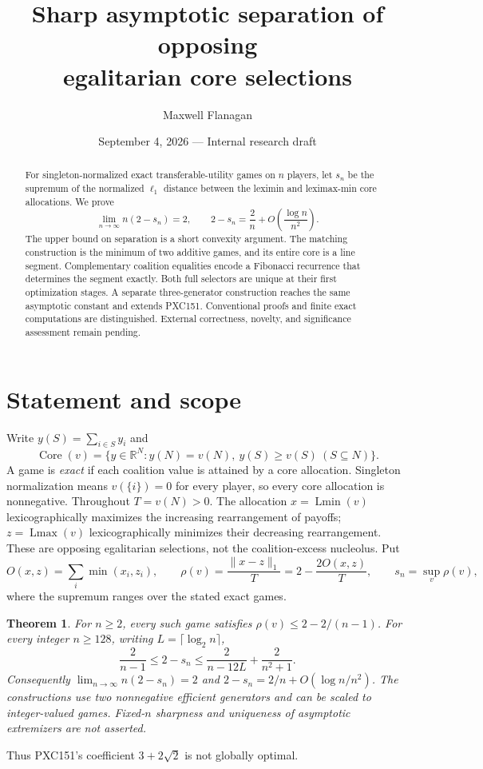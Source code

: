 \documentclass[11pt]{article}
\title{Sharp asymptotic separation of opposing\\ egalitarian core selections}
\author{Maxwell Flanagan}
\date{September 4, 2026 --- Internal research draft}
\newtheorem{theorem}{Theorem}
\newcommand{\Lmin}{\operatorname{Lmin}}
\newcommand{\Lmax}{\operatorname{Lmax}}
\newcommand{\Core}{\operatorname{Core}}
\begin{document}
\maketitle
\begin{abstract}
For singleton-normalized exact transferable-utility games on $n$ players,
let $s_n$ be the supremum of the normalized $\ell_1$ distance between the
leximin and leximax-min core allocations. We prove
\[
 \lim_{n\to\infty}n(2-s_n)=2,
 \qquad 2-s_n=\frac2n+O\!\left(\frac{\log n}{n^2}\right).
\]
The upper bound on separation is a short convexity argument. The matching
construction is the minimum of two additive games, and its entire core is
a line segment. Complementary coalition equalities encode a Fibonacci
recurrence that determines the segment exactly. Both full selectors are
unique at their first optimization stages. A separate three-generator
construction reaches the same asymptotic constant and extends PXC151.
Conventional proofs and finite exact computations are distinguished.
External correctness, novelty, and significance assessment remain pending.
\end{abstract}

\section{Statement and scope}
Write $y(S)=\sum_{i\in S}y_i$ and
\[
 \Core(v)=\{y\in\mathbb R^N:y(N)=v(N),\ y(S)\ge v(S)\ (S\subseteq N)\}.
\]
A game is \emph{exact} if each coalition value is attained by a core
allocation. Singleton normalization means $v(\{i\})=0$ for every player,
so every core allocation is nonnegative. Throughout $T=v(N)>0$.
The allocation $x=\Lmin(v)$ lexicographically maximizes the increasing
rearrangement of payoffs; $z=\Lmax(v)$ lexicographically minimizes their
decreasing rearrangement. These are opposing egalitarian selections, not
the coalition-excess nucleolus. Put
\[
 O(x,z)=\sum_i\min(x_i,z_i),\qquad
 \rho(v)=\frac{\|x-z\|_1}{T}=2-\frac{2O(x,z)}T,
 \qquad s_n=\sup_v\rho(v),
\]
where the supremum ranges over the stated exact games.
\begin{theorem}\label{thm:main}
For $n\ge2$, every such game satisfies $\rho(v)\le2-2/(n-1)$.
For every integer $n\ge128$, writing $L=\lceil\log_2n\rceil$,
\begin{equation}\label{eq:explicit}
 \frac2{n-1}\le 2-s_n
 \le\frac2{n-12L}+\frac2{n^2+1}.
\end{equation}
Consequently $\lim_{n\to\infty}n(2-s_n)=2$ and
$2-s_n=2/n+O(\log n/n^2)$. The constructions use two nonnegative efficient
generators and can be scaled to integer-valued games. Fixed-$n$ sharpness
and uniqueness of asymptotic extremizers are not asserted.
\end{theorem}
Thus PXC151's coefficient $3+2\sqrt2$ is not globally optimal.
\end{document}
